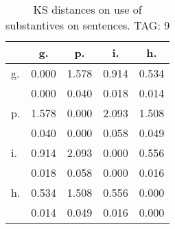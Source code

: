 \begin{table}[h!]
\begin{center}
\begin{tabular}{| l | c | c | c | c |}\hline
 & g. & p. & i. & h. \\\hline
g. & 0.000  & 1.578  & 0.914  & 0.534 \\\hline
 & 0.000  & 0.040  & 0.018  & 0.014 \\\hline
p. & 1.578  & 0.000  & 2.093  & 1.508 \\\hline
 & 0.040  & 0.000  & 0.058  & 0.049 \\\hline
i. & 0.914  & 2.093  & 0.000  & 0.556 \\\hline
 & 0.018  & 0.058  & 0.000  & 0.016 \\\hline
h. & 0.534  & 1.508  & 0.556  & 0.000 \\\hline
 & 0.014  & 0.049  & 0.016  & 0.000 \\\hline
\end{tabular}
\caption{KS distances on use of substantives on sentences. TAG: 9}
\end{center}
\end{table}